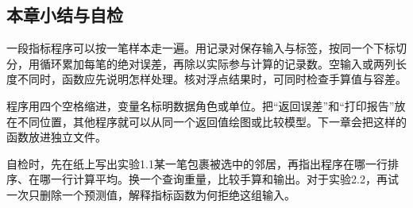 \documentclass[UTF8,fontset=none,zihao=-4,a4paper]{ctexart}
\numberwithin{equation}{section}
\numberwithin{figure}{section}
\begin{document}
\subsection{本章小结与自检}
一段指标程序可以按一笔样本走一遍。用记录对保存输入与标签，按同一个下标切分，用循环累加每笔的绝对误差，再除以实际参与计算的记录数。空输入或两列长度不同时，函数应先说明怎样处理。核对浮点结果时，可同时检查手算值与容差。

程序用四个空格缩进，变量名标明数据角色或单位。把“返回误差”和“打印报告”放在不同位置，其他程序就可以从同一个返回值绘图或比较模型。下一章会把这样的函数放进独立文件。

自检时，先在纸上写出实验1.1某一笔包裹被选中的邻居，再指出程序在哪一行排序、在哪一行计算平均。换一个查询重量，比较手算和输出。对于实验2.2，再试一次只删除一个预测值，解释指标函数为何拒绝这组输入。

\clearpage
\end{document}
